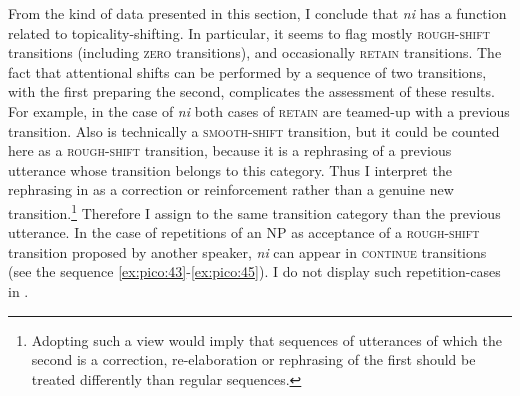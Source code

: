 \documentclass[output=paper
,modfonts
,nonflat]{langsci/langscibook}
\begin{document}
From the kind of data presented in this section, I conclude that \textit{ni} has a function related to topicality-shifting. In particular, it seems to flag mostly \textsc{rough-shift} transitions (including \textsc{zero} transitions), and occasionally \textsc{retain} transitions. 
The fact that attentional shifts can be performed by a sequence of two transitions, with the first preparing the second, complicates the assessment of these results. For example, in the case of \textit{ni} both cases of \textsc{retain} are teamed-up with a previous transition. 
Also  is technically a \textsc{smooth-shift} transition, but it could be counted here as a \textsc{rough-shift} transition, because it is a rephrasing of a previous utterance whose transition belongs to this category. Thus I interpret the rephrasing in  as a correction or reinforcement rather than a genuine new transition.\footnote{Adopting such a view would imply that sequences of utterances of which the second is a correction, re-elaboration or rephrasing of the first should be treated differently than regular sequences.} Therefore I assign to  the same transition category than the previous utterance. In the case of repetitions of an NP as acceptance of a \textsc{rough-shift} transition proposed by another speaker, \textit{ni} can appear in \textsc{continue} transitions (see the sequence \ref{ex:pico:43}-\ref{ex:pico:45}). I do not display such repetition-cases in .
\largerpage[2]
\end{document}
